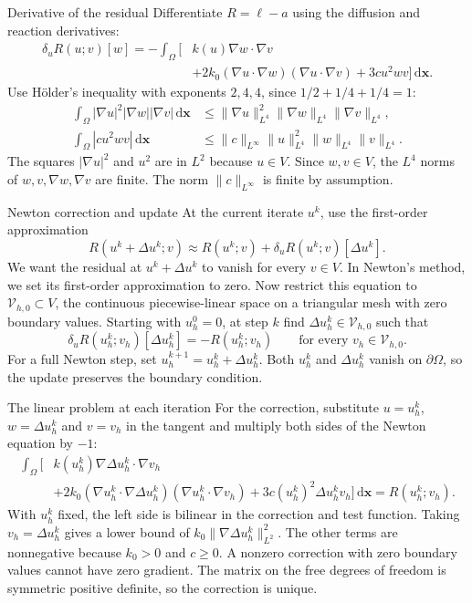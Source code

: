 \documentclass[11pt,aspectratio=169]{beamer}
\newcommand{\bx}{\bm x}
\newcommand{\dd}{\mathrm d}
\newcommand{\Vhzero}{\mathcal V_{h,0}}
\begin{document}
\begin{frame}{Derivative of the residual}
Differentiate $R=\ell-a$ using the diffusion and reaction derivatives:
\[
\boxed{\begin{aligned}
\delta_u R(u;v)[w]=-\int_\Omega\bigl[&
 k(u)\nabla w\cdot\nabla v\\
 &+2k_0(\nabla u\cdot\nabla w)(\nabla u\cdot\nabla v)
 +3cu^2wv\bigr]\,\dd\bx.
\end{aligned}}
\]
Use H\"older's inequality with exponents $2,4,4$, since $1/2+1/4+1/4=1$:
\[
\begin{aligned}
\int_\Omega|\nabla u|^2|\nabla w||\nabla v|\,\dd\bx
&\le \|\nabla u\|_{L^4}^2\|\nabla w\|_{L^4}\|\nabla v\|_{L^4},\\
\int_\Omega |cu^2wv|\,\dd\bx
&\le \|c\|_{L^\infty}\|u\|_{L^4}^2\|w\|_{L^4}\|v\|_{L^4}.
\end{aligned}
\]
The squares $|\nabla u|^2$ and $u^2$ are in $L^2$ because $u\in V$.
Since $w,v\in V$, the $L^4$ norms of $w,v,\nabla w,\nabla v$ are finite.
The norm $\|c\|_{L^\infty}$ is finite by assumption.

\end{frame}

\begin{frame}{Newton correction and update}
At the current iterate $u^k$, use the first-order approximation
\[
R(u^k+\Delta u^k;v)\approx
 R(u^k;v)+\delta_u R(u^k;v)[\Delta u^k].
\]
We want the residual at $u^k+\Delta u^k$ to vanish for every $v\in V$.
In Newton's method, we set its first-order approximation to zero.
Now restrict this equation to
$\Vhzero\subset V$, the continuous piecewise-linear space on a triangular
mesh with zero boundary values. Starting with $u_h^0=0$, at step $k$ find
$\Delta u_h^k\in\Vhzero$ such that
\[
\delta_u R(u_h^k;v_h)[\Delta u_h^k]=-R(u_h^k;v_h)
\qquad \text{for every }v_h\in\Vhzero.
\]
For a full Newton step, set $u_h^{k+1}=u_h^k+\Delta u_h^k$.
Both $u_h^k$ and $\Delta u_h^k$ vanish on $\partial\Omega$, so the update
preserves the boundary condition.
\end{frame}

\begin{frame}{The linear problem at each iteration}
For the correction, substitute $u=u_h^k$, $w=\Delta u_h^k$ and $v=v_h$
in the tangent and multiply both sides of the Newton equation by $-1$:
\[
\begin{aligned}
\int_\Omega\bigl[&
 k(u_h^k)\nabla\Delta u_h^k\cdot\nabla v_h\\
 &+2k_0(\nabla u_h^k\cdot\nabla\Delta u_h^k)(\nabla u_h^k\cdot\nabla v_h)
 +3c(u_h^k)^2\Delta u_h^k v_h\bigr]\,\dd\bx
 =R(u_h^k;v_h).
\end{aligned}
\]
With $u_h^k$ fixed, the left side is bilinear in the correction and test
function. Taking $v_h=\Delta u_h^k$ gives a lower bound of
$k_0\|\nabla\Delta u_h^k\|_{L^2}^2$. The other terms are nonnegative because
$k_0>0$ and $c\ge 0$.
A nonzero correction with zero boundary values cannot have zero gradient.
The matrix on the free degrees of freedom is symmetric positive definite,
so the correction is unique.
\end{frame}
\end{document}
